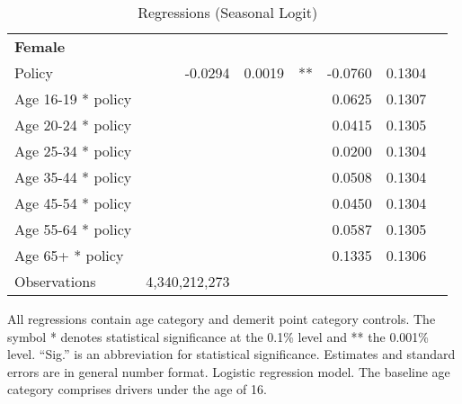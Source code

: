 \begin{table}
\begin{tabular}{l r r l r r l}
\hline 

\textbf{Female} \\ 

Policy             &  -0.0294        &  0.0019       &   **       &  -0.0760        &  0.1304       &            \\ 
Age 16-19 * policy           & & &  &  0.0625        &  0.1307       &            \\ 
Age 20-24 * policy           & & &  &  0.0415        &  0.1305       &            \\ 
Age 25-34 * policy           & & &  &  0.0200        &  0.1304       &            \\ 
Age 35-44 * policy           & & &  &  0.0508        &  0.1304       &            \\ 
Age 45-54 * policy           & & &  &  0.0450        &  0.1304       &            \\ 
Age 55-64 * policy           & & &  &  0.0587        &  0.1305       &            \\ 
Age 65+ * policy           & & &  &  0.1335        &  0.1306       &            \\ 
Observations & 4,340,212,273 \\ 


\hline 

\end{tabular} 
\caption{Regressions (Seasonal Logit)} 
All regressions contain age category and demerit point category controls. 
The symbol * denotes statistical significance at the 0.1\% level 
and ** the 0.001\% level. 
``Sig.'' is an abbreviation for statistical significance. 
Estimates and standard errors are in general number format. 
Logistic regression model. 
The baseline age category comprises drivers under the age of 16. 
\label{tab:seas_logit_regs} 
\end{table} 
 
